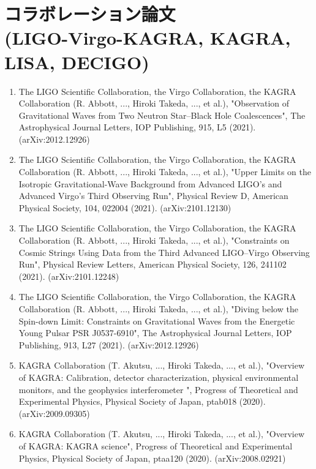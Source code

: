 \documentclass[uplatex, 12pt,a4paper]{jsarticle}
\begin{document}
\section*{コラボレーション論文 \\(LIGO-Virgo-KAGRA, KAGRA, LISA, DECIGO)}
\begin{enumerate}
\item The LIGO Scientific Collaboration, the Virgo Collaboration, the KAGRA Collaboration (R. Abbott, ..., Hiroki Takeda, ..., et al.), "Observation of Gravitational Waves from Two Neutron Star–Black Hole Coalescences", The Astrophysical Journal Letters, IOP Publishing, 915, L5 (2021). (arXiv:2012.12926)

\item The LIGO Scientific Collaboration, the Virgo Collaboration, the KAGRA Collaboration (R. Abbott, ..., Hiroki Takeda, ..., et al.), "Upper Limits on the Isotropic Gravitational-Wave Background from Advanced LIGO's and Advanced Virgo's Third Observing Run", Physical Review D, American Physical Society, 104, 022004 (2021). (arXiv:2101.12130)

\item The LIGO Scientific Collaboration, the Virgo Collaboration, the KAGRA Collaboration (R. Abbott, ..., Hiroki Takeda, ..., et al.), "Constraints on Cosmic Strings Using Data from the Third Advanced LIGO–Virgo Observing Run", Physical Review Letters, American Physical Society, 126, 241102 (2021). (arXiv:2101.12248)

\item The LIGO Scientific Collaboration, the Virgo Collaboration, the KAGRA Collaboration (R. Abbott, ..., Hiroki Takeda, ..., et al.), "Diving below the Spin-down Limit: Constraints on Gravitational Waves from the Energetic Young Pulsar PSR J0537-6910", The Astrophysical Journal Letters, IOP Publishing, 913, L27 (2021). (arXiv:2012.12926)

\item KAGRA Collaboration (T. Akutsu, ..., Hiroki Takeda, ..., et al.), "Overview of KAGRA: Calibration, detector characterization, physical environmental monitors, and the geophysics interferometer ", Progress of Theoretical and Experimental Physics, Physical Society of Japan, ptab018 (2020). (arXiv:2009.09305)

\item KAGRA Collaboration (T. Akutsu, ..., Hiroki Takeda, ..., et al.), "Overview of KAGRA: KAGRA science", Progress of Theoretical and Experimental Physics, Physical Society of Japan, ptaa120 (2020). (arXiv:2008.02921)


\end{enumerate}
\end{document}
